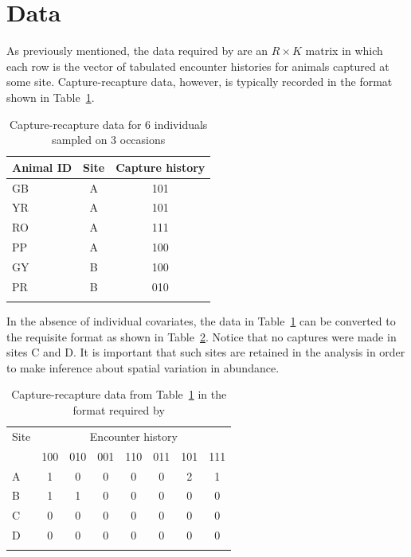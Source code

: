 \documentclass[a4paper]{article}
\begin{document}
\section*{Data}
As previously mentioned, the data required by  are an $R
\times K$
matrix in which each row is the vector of tabulated encounter
histories for animals captured at some site. Capture-recapture data,
however, is typically recorded in the format shown in
Table~\ref{tab:raw}.

\begin{table}[h]
  \footnotesize
  \begin{center}
  \caption{Capture-recapture data for 6 individuals sampled on 3
    occasions}
  \vspace{0.3cm}
  \begin{tabular}{lcc}
    \hline
    Animal ID   & Site  & Capture history \\
    \hline
    GB        & A     & 101 \\
    YR        & A     & 101 \\
    RO        & A     & 111 \\
    PP        & A     & 100 \\
    GY        & B     & 100 \\
    PR        & B     & 010 \\
    \hline
  \label{tab:raw}
  \end{tabular}
  \end{center}
\end{table}

In the absence of individual covariates, the data in
Table~\ref{tab:raw} can be converted to the requisite format as shown
in Table~\ref{tab:format}. Notice that no captures were made in sites
C and D. It is important that such sites are retained in the analysis
in order to make inference about spatial variation in abundance.

\begin{table}[h]
  \footnotesize
  \begin{center}
  \caption{Capture-recapture data from Table~\ref{tab:raw} in the
    format required by }
  \vspace{0.3cm}
  \begin{tabular}{lccccccc}
    \hline
    Site  & \multicolumn{7}{c}{Encounter history} \\
    \cline{2-8}
          & 100 & 010 & 001 & 110 & 011 & 101 & 111 \\
    \hline
    A     & 1   & 0   & 0   & 0   & 0   & 2   & 1   \\
    B     & 1   & 1   & 0   & 0   & 0   & 0   & 0   \\
    C     & 0   & 0   & 0   & 0   & 0   & 0   & 0   \\
    D     & 0   & 0   & 0   & 0   & 0   & 0   & 0   \\
    \hline
  \label{tab:format}
  \end{tabular}
  \end{center}
\end{table}
\end{document}
